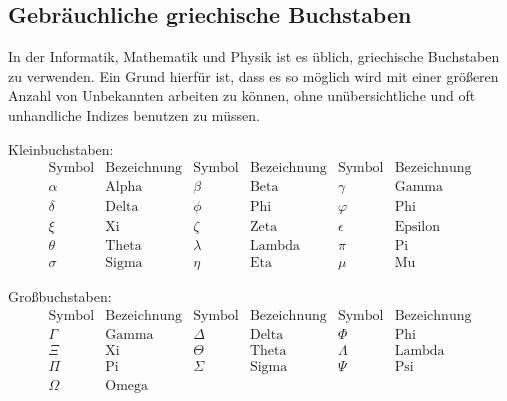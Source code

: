 \subsection{Gebräuchliche griechische Buchstaben}
In der Informatik, Mathematik und Physik ist es üblich, griechische 
Buchstaben zu verwenden. Ein Grund hierfür ist, dass es so möglich 
wird mit einer größeren Anzahl von Unbekannten arbeiten zu können, ohne
unübersichtliche und oft unhandliche Indizes benutzen zu müssen.

\bigskip

\noindent Kleinbuchstaben:
\begin{displaymath}
\begin{array}{c|c||c|c||c|c}
\text{Symbol} & \text{Bezeichnung} & \text{Symbol}
& \text{Bezeichnung} & \text{Symbol} & \text{Bezeichnung}\\
\hline
\alpha & \text{Alpha} & \beta   & \text{Beta}   & \gamma   & \text{Gamma}\\
\hline
\delta & \text{Delta} & \phi    & \text{Phi}    & \varphi  & \text{Phi}\\
\hline
\xi    & \text{Xi}    & \zeta   & \text{Zeta}   & \epsilon & \text{Epsilon}\\         
\hline
\theta & \text{Theta} & \lambda & \text{Lambda} & \pi      & \text{Pi}\\
\hline
\sigma & \text{Sigma} & \eta    & \text{Eta}    & \mu      & \text{Mu}
\end{array}
\end{displaymath}

\bigskip

\noindent Großbuchstaben:
\begin{displaymath}
\begin{array}{c|c||c|c||c|c}
\text{Symbol} & \text{Bezeichnung} & \text{Symbol}
& \text{Bezeichnung} & \text{Symbol} & \text{Bezeichnung}\\
\hline
\Gamma & \text{Gamma} & \Delta & \text{Delta} & \Phi    & \text{Phi}\\
\hline
\Xi    & \text{Xi}    & \Theta & \text{Theta} & \Lambda & \text{Lambda}\\
\hline
\Pi    & \text{Pi}    & \Sigma & \text{Sigma} & \Psi    & \text{Psi}\\
\hline
\Omega & \text{Omega} & &
\end{array}
\end{displaymath}



